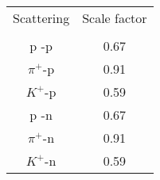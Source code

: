 \begin{center}
\begin{tabular}{||c|c||}\hline
 Scattering & Scale factor \\
  & \\\hline
p -p     & 0.67 \\
$\pi^+$-p& 0.91 \\
$K^+$-p  & 0.59 \\
p -n     & 0.67 \\
$\pi^+$-n& 0.91 \\
$K^+$-n  & 0.59 \\\hline
\end{tabular}
\end{center}